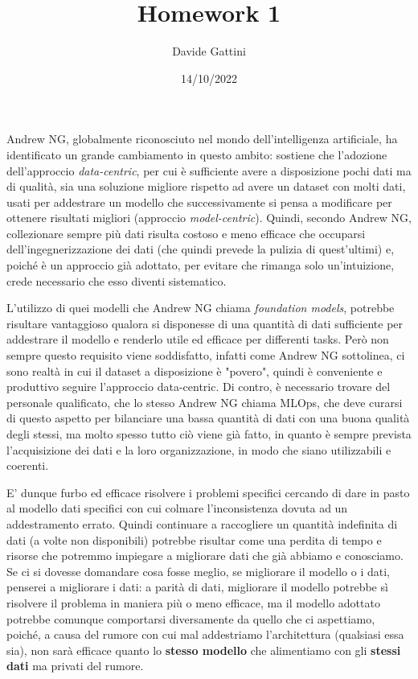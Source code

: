 \documentclass{article}
\begin{document}
\title{Homework 1}
\author{Davide Gattini}
\date{14/10/2022}
\maketitle

Andrew NG, globalmente riconosciuto nel mondo dell'intelligenza artificiale, ha identificato un grande cambiamento in questo ambito: sostiene che l'adozione dell'approccio \textit{data-centric}, per cui è sufficiente avere a disposizione pochi dati ma di qualità, sia una soluzione migliore rispetto ad avere un dataset con molti dati, usati per addestrare un modello che successivamente si pensa a modificare per ottenere risultati migliori (approccio \textit{model-centric}). Quindi, secondo Andrew NG, collezionare sempre più dati risulta costoso e meno efficace che occuparsi dell'ingegnerizzazione dei dati (che quindi prevede la pulizia di quest'ultimi) e, poiché è un approccio già adottato, per evitare che rimanga solo un'intuizione, crede necessario che esso diventi sistematico.


L'utilizzo di quei modelli che Andrew NG chiama \textit{foundation models}, potrebbe risultare vantaggioso qualora si disponesse di una quantità di dati sufficiente per addestrare il modello e renderlo utile ed efficace per differenti tasks. Però non sempre questo requisito viene soddisfatto, infatti come Andrew NG sottolinea, ci sono realtà in cui il dataset a disposizione è "povero", quindi è conveniente e produttivo seguire l'approccio data-centric. Di contro, è necessario trovare del personale qualificato, che lo stesso Andrew NG chiama MLOps, che deve curarsi di questo aspetto per bilanciare una bassa quantità di dati con una buona qualità degli stessi, ma molto spesso tutto ciò viene già fatto, in quanto è sempre prevista l'acquisizione dei dati e la loro organizzazione, in modo che siano utilizzabili e coerenti.

E' dunque furbo ed efficace risolvere i problemi specifici cercando di dare in pasto al modello dati specifici con cui colmare l'inconsistenza dovuta ad un addestramento errato. Quindi continuare a raccogliere un quantità indefinita di dati (a volte non disponibili) potrebbe risultar come una perdita di tempo e risorse che potremmo impiegare a migliorare dati che già abbiamo e conosciamo. Se ci si dovesse domandare cosa fosse meglio, se migliorare il modello o i dati, penserei a migliorare i dati: a parità di dati, migliorare il modello potrebbe sì risolvere il problema in maniera più o meno efficace, ma il modello adottato potrebbe comunque comportarsi diversamente da quello che ci aspettiamo, poiché, a causa del rumore con cui mal addestriamo l'architettura (qualsiasi essa sia), non sarà efficace quanto lo \textbf{stesso modello} che alimentiamo con gli \textbf{stessi dati} ma privati del rumore.
\end{document}
